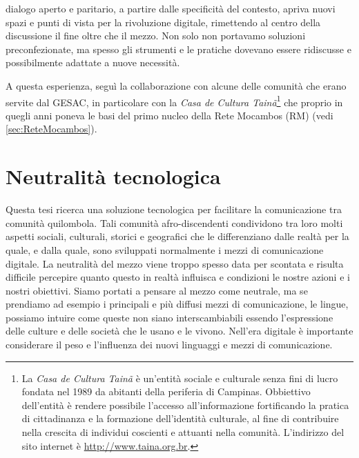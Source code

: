   dialogo aperto e paritario, a partire dalle specificità del
  contesto, apriva nuovi spazi e punti di vista per la rivoluzione
  digitale, rimettendo al centro della discussione il fine oltre che
  il mezzo. Non solo non portavamo soluzioni preconfezionate, ma
  spesso gli strumenti e le pratiche dovevano essere ridiscusse e
  possibilmente adattate a nuove necessità.

A questa esperienza, seguì la collaborazione con alcune delle comunità
che erano servite dal GESAC, in particolare con la \emph{Casa de
  Cultura Tainã}\footnote{La \emph{Casa de Cultura Tainã} è un'entità
  sociale e culturale senza fini di lucro fondata nel 1989 da abitanti
  della periferia di Campinas. Obbiettivo dell'entità è rendere
  possibile l'accesso all'informazione fortificando la pratica di
  cittadinanza e la formazione dell'identità culturale, al fine di
  contribuire nella crescita di individui coscienti e attuanti nella
  comunità. L'indirizzo del sito internet è
  \url{http://www.taina.org.br}.} che proprio in quegli anni poneva le
basi del primo nucleo della Rete Mocambos (RM) (vedi
\ref{sec:ReteMocambos}). 

\section{Neutralità tecnologica}
Questa tesi ricerca una soluzione tecnologica per facilitare la
comunicazione tra comunità quilombola. Tali comunità
afro-discendenti condividono tra loro molti aspetti sociali,
culturali, storici e geografici che le differenziano dalle realtà per
la quale, e dalla quale, sono sviluppati normalmente i mezzi di
comunicazione digitale. La neutralità del mezzo viene troppo spesso
data per scontata e risulta difficile percepire quanto questo in
realtà influisca e condizioni le nostre azioni e i nostri
obiettivi. Siamo portati a pensare al mezzo come neutrale, ma se
prendiamo ad esempio i principali e più diffusi mezzi di
comunicazione, le lingue, possiamo intuire come queste non siano
interscambiabili essendo l'espressione delle culture e delle società
che le usano e le vivono. Nell'era digitale è importante considerare
il peso e l'influenza dei nuovi linguaggi e mezzi di comunicazione.


